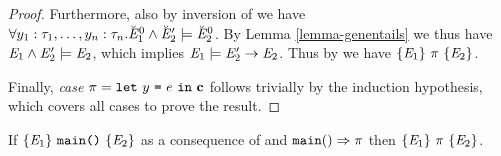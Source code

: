 \begin{proof}
  Furthermore, also by inversion of  we have
  $\forall y_1:\tau_1,\ldots,y_n:\tau_n . \breve{\mathit{E}}^0_1 \wedge 
  \breve{\mathit{E}}_2' \models \breve{\mathit{E}}^0_2$. 
  By Lemma \ref{lemma-genentails} we thus have $\mathit{E}_1
  \wedge \mathit{E}_2' \models \mathit{E}_2$, which implies
  $\mathit{E}_1 \models \mathit{E}_2' \rightarrow \mathit{E}_2$.
  Thus by  we have $\{ \mathit{E}_1 \}\ \pi\ \{ \mathit{E}_2 \}$.

  Finally, \textit{case} $\pi = \texttt{let}\ y\ \texttt{=}\ e\ \texttt{in}\ \mathbf{c}$ follows trivially
  by the induction hypothesis, which covers all cases to prove
  the result.
\end{proof}

\begin{theorem}
  If $\{ \mathit{E}_1 \}\ \texttt{main()}\ \{ \mathit{E}_2 \}$ as a consequence of
   and $\texttt{main}() \Rightarrow \pi$ then
  $\{ \mathit{E}_1 \}\ \pi\ \{ \mathit{E}_2 \}$.
\end{theorem}
